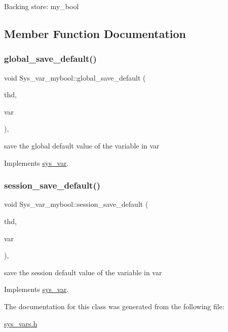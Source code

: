 Backing store\+: my\+\_\+bool 

\subsection{Member Function Documentation}
\mbox{\label{classSys__var__mybool_aecba009ba09790acfb4201c2d1bb1f84}} 
\subsubsection{\texorpdfstring{global\+\_\+save\+\_\+default()}{global\_save\_default()}}
{\footnotesize\ttfamily void Sys\+\_\+var\+\_\+mybool\+::global\+\_\+save\+\_\+default (\begin{DoxyParamCaption}\item[{T\+HD $\ast$}]{thd,  }\item[{\mbox{\hyperlink{classset__var}{set\+\_\+var}} $\ast$}]{var }\end{DoxyParamCaption})\hspace{0.3cm}{\ttfamily [inline]}, {\ttfamily [virtual]}}

save the global default value of the variable in var 

Implements \mbox{\hyperlink{classsys__var}{sys\+\_\+var}}.

\mbox{\label{classSys__var__mybool_a7c0f82c4951aa5a3b41921a62197473d}} 
\subsubsection{\texorpdfstring{session\+\_\+save\+\_\+default()}{session\_save\_default()}}
{\footnotesize\ttfamily void Sys\+\_\+var\+\_\+mybool\+::session\+\_\+save\+\_\+default (\begin{DoxyParamCaption}\item[{T\+HD $\ast$}]{thd,  }\item[{\mbox{\hyperlink{classset__var}{set\+\_\+var}} $\ast$}]{var }\end{DoxyParamCaption})\hspace{0.3cm}{\ttfamily [inline]}, {\ttfamily [virtual]}}

save the session default value of the variable in var 

Implements \mbox{\hyperlink{classsys__var}{sys\+\_\+var}}.



The documentation for this class was generated from the following file\+:\begin{DoxyCompactItemize}
\item 
\mbox{\hyperlink{sys__vars_8h}{sys\+\_\+vars.\+h}}\end{DoxyCompactItemize}
